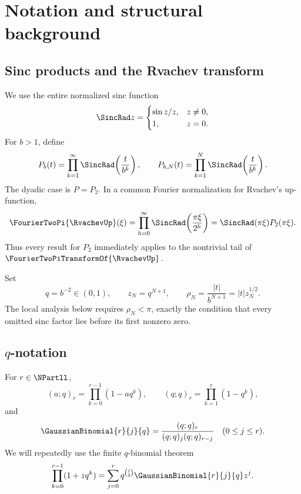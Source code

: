 \documentclass[11pt]{article}
\numberwithin{equation}{section}
\theoremstyle{definition}
\theoremstyle{remark}
\begin{document}
\section{Notation and structural background}
\label{p8:sec:notation}

\subsection{Sinc products and the Rvachev transform}

We use the entire normalized sinc function
\[
\SincRad z=\begin{cases}\sin z/z,&z\ne0,\\1,&z=0.\end{cases}
\]
For $b>1$, define
\begin{equation}
P_b(t)=\prod_{k=1}^{\infty}\SincRad\!\left(\frac{t}{b^k}\right),
\qquad
P_{b,N}(t)=\prod_{k=1}^{N}\SincRad\!\left(\frac{t}{b^k}\right).
\label{p8:eq:Pb-def}
\end{equation}
The dyadic case is $P=P_2$. In a common Fourier normalization for Rvachev's up-function,
\begin{equation}
\FourierTwoPi{\RvachevUp}(\xi)=\prod_{h=0}^{\infty}\SincRad\!\left(\frac{\pi\xi}{2^h}\right)
=\SincRad(\pi\xi)P_2(\pi\xi).
\label{p8:eq:up-factor}
\end{equation}
Thus every result for $P_2$ immediately applies to the nontrivial tail of $\FourierTwoPiTransformOf{\RvachevUp}$.

Set
\begin{equation}
q=b^{-2}\in(0,1),\qquad z_N=q^{N+1},\qquad
\rho_N=\frac{|t|}{b^{N+1}}=|t|z_N^{1/2}.
\label{p8:eq:q-z-rho}
\end{equation}
The local analysis below requires $\rho_N<\pi$, exactly the condition that every omitted sinc factor lies before its first nonzero zero.

\subsection{\texorpdfstring{$q$}{q}-notation}

For $r\in\NPartll$,
\[
(a;q)_r=\prod_{k=0}^{r-1}(1-aq^k),\qquad
(q;q)_r=\prod_{k=1}^{r}(1-q^k),
\]
and
\[
\GaussianBinomial{r}{j}{q}=\frac{(q;q)_r}{(q;q)_j(q;q)_{r-j}}
\quad(0\le j\le r).
\]
We will repeatedly use the finite $q$-binomial theorem
\begin{equation}
\prod_{k=0}^{r-1}(1+zq^k)
=\sum_{j=0}^{r}q^{\binom{j}{2}}\GaussianBinomial{r}{j}{q} z^j.
\label{p8:eq:q-binomial}
\end{equation}
\end{document}
